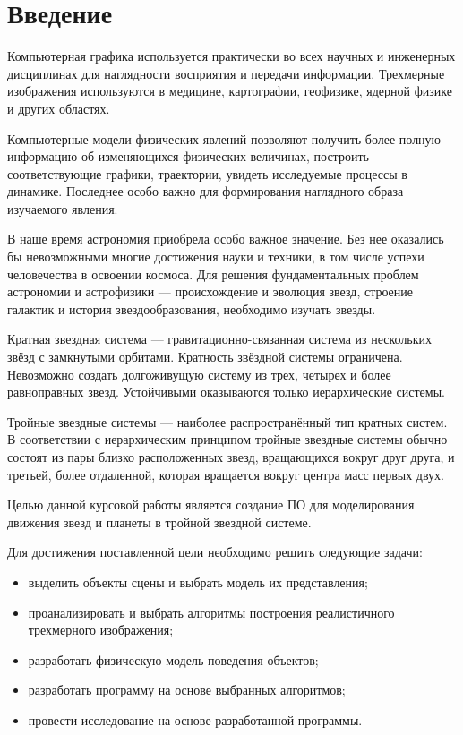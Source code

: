\chapter*{Введение}

Компьютерная графика используется практически во всех научных и инженерных дисциплинах для наглядности восприятия и передачи информации. Трехмерные изображения используются в медицине, картографии, геофизике, ядерной физике и других областях. 

Компьютерные модели физических явлений позволяют получить более полную информацию об изменяющихся физических величинах, построить соответствующие графики, траектории, увидеть исследуемые процессы в динамике. Последнее особо важно для формирования наглядного образа изучаемого явления.

В наше время астрономия приобрела особо важное значение. Без нее оказались бы невозможными многие достижения науки и техники, в том числе успехи человечества в освоении космоса.
Для решения фундаментальных проблем астрономии и астрофизики --- происхождение и эволюция звезд, строение галактик и история звездообразования, необходимо изучать звезды.

Кратная звездная система --- гравитационно-связанная система из нескольких звёзд с замкнутыми орбитами. Кратность звёздной системы ограничена. Невозможно создать долгоживущую систему из трех, четырех и более равноправных звезд. Устойчивыми оказываются только иерархические системы. 

Тройные звездные системы --- наиболее распространённый тип кратных систем. В соответствии с иерархическим принципом тройные звездные системы обычно состоят из пары близко расположенных звезд, вращающихся вокруг друг друга, и третьей, более отдаленной, которая вращается вокруг центра масс первых двух.

Целью данной курсовой работы является создание ПО для моделирования движения звезд и планеты в тройной звездной системе.

Для достижения поставленной цели необходимо решить следующие задачи:

\begin{itemize}[label=---]
    \item выделить объекты сцены и выбрать модель их представления;
    \item проанализировать и выбрать алгоритмы построения реалистичного трехмерного изображения;
    \item разработать физическую модель поведения объектов;
    \item разработать программу на основе выбранных алгоритмов; 
    \item провести исследование на основе разработанной программы.
\end{itemize}
